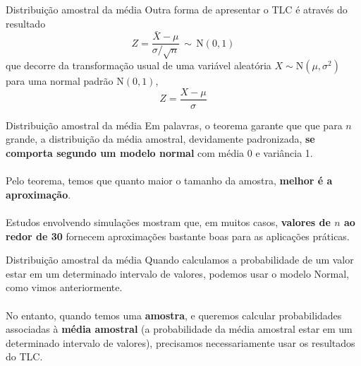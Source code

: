 \documentclass[10pt]{beamer}\usepackage[]{graphicx}\usepackage[]{color}
\theoremstyle{definition}
\begin{document}
\begin{frame}{Distribuição amostral da média}
  Outra forma de apresentar o TLC é através do resultado
  \begin{equation*}
    Z = \frac{\bar{X} - \mu}{\sigma/\sqrt{n}} \, \sim \, \text{N}(0,1)
  \end{equation*}
  que decorre da transformação usual de uma variável aleatória $X \sim
  \text{N}(\mu, \sigma^2)$ para uma normal padrão $\text{N}(0,1)$,
  \begin{equation*}
    Z = \frac{X - \mu}{\sigma}
  \end{equation*}
\end{frame}

\begin{frame}{Distribuição amostral da média}
  Em palavras, o teorema garante que que para $n$ grande, a distribuição
  da média amostral, devidamente padronizada, \textbf{se comporta segundo um
  modelo normal} com média 0 e variância 1. \\~\\
  Pelo teorema, temos que quanto maior o tamanho da amostra, \textbf{melhor é a
  aproximação}. \\~\\
  Estudos envolvendo simulações mostram que, em muitos casos, \textbf{valores de
  $n$ ao redor de 30} fornecem aproximações bastante boas para as
  aplicações práticas.
\end{frame}

\begin{frame}{Distribuição amostral da média}
  Quando calculamos a probabilidade de um valor estar em um determinado
  intervalo de valores, podemos usar o modelo Normal, como vimos
  anteriormente. \\~\\
  No entanto, quando temos uma \textbf{amostra}, e queremos calcular
  probabilidades associadas à \textbf{média amostral} (a probabilidade
  da média amostral estar em um determinado intervalo de valores),
  precisamos necessariamente usar os resultados do TLC.
\end{frame}
\end{document}
